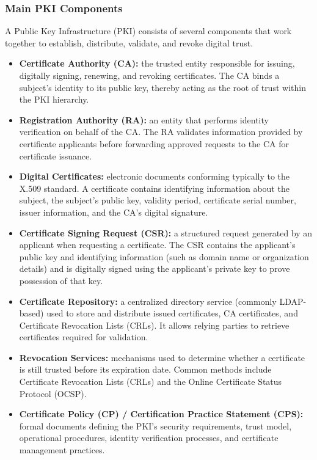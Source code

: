 \documentclass[10pt,twocolumn]{article}
\begin{document}
\subsubsection{Main PKI Components}

A Public Key Infrastructure (PKI) consists of several components that work
together to establish, distribute, validate, and revoke digital trust.

\begin{itemize}
  \item \textbf{Certificate Authority (CA):} the trusted entity responsible for
        issuing, digitally signing, renewing, and revoking certificates. The
        CA binds a subject's identity to its public key, thereby acting as the
        root of trust within the PKI hierarchy.

  \item \textbf{Registration Authority (RA):} an entity that performs identity
        verification on behalf of the CA. The RA validates information provided
        by certificate applicants before forwarding approved requests to the
        CA for certificate issuance.

  \item \textbf{Digital Certificates:} electronic documents conforming
        typically to the X.509 standard. A certificate contains identifying
        information about the subject, the subject's public key, validity
        period, certificate serial number, issuer information, and the CA's
        digital signature.

  \item \textbf{Certificate Signing Request (CSR):} a structured request
        generated by an applicant when requesting a certificate. The CSR
        contains the applicant's public key and identifying information
        (such as domain name or organization details) and is digitally signed
        using the applicant's private key to prove possession of that key.

  \item \textbf{Certificate Repository:} a centralized directory service
        (commonly LDAP-based) used to store and distribute issued certificates,
        CA certificates, and Certificate Revocation Lists (CRLs). It allows
        relying parties to retrieve certificates required for validation.

  \item \textbf{Revocation Services:} mechanisms used to determine whether a
        certificate is still trusted before its expiration date. Common methods
        include Certificate Revocation Lists (CRLs) and the Online Certificate
        Status Protocol (OCSP).

  \item \textbf{Certificate Policy (CP) / Certification Practice Statement
        (CPS):} formal documents defining the PKI's security requirements,
        trust model, operational procedures, identity verification processes,
        and certificate management practices.
\end{itemize}
\end{document}
